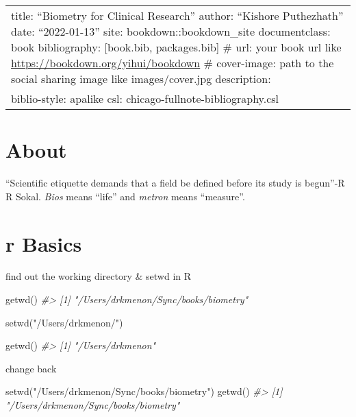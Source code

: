 \documentclass[
]{article}
\author{}
\date{\vspace{-2.5em}}
\newenvironment{Shaded}{\begin{snugshade}}{\end{snugshade}}
\newcommand{\CommentTok}[1]{\textcolor[rgb]{0.56,0.35,0.01}{\textit{#1}}}
\newcommand{\FunctionTok}[1]{\textcolor[rgb]{0.00,0.00,0.00}{#1}}
\newcommand{\NormalTok}[1]{#1}
\newcommand{\StringTok}[1]{\textcolor[rgb]{0.31,0.60,0.02}{#1}}
\begin{document}
{
\setcounter{tocdepth}{2}
\tableofcontents
}
\begin{longtable}[]{@{}
  >{\raggedright\arraybackslash}p{}@{}}
\toprule
\endhead
title: ``Biometry for Clinical Research''
author: ``Kishore Puthezhath''
date: ``2022-01-13''
site: bookdown::bookdown\_site
documentclass: book
bibliography: {[}book.bib, packages.bib{]}
\# url: your book url like \url{https://bookdown.org/yihui/bookdown}
\# cover-image: path to the social sharing image like images/cover.jpg
description: \textbar{} \\
biblio-style: apalike
csl: chicago-fullnote-bibliography.csl \\
\bottomrule
\end{longtable}

\hypertarget{about}{%
\section{About}\label{about}}

``Scientific etiquette demands that a field be defined before its study is begun''-R R Sokal. \emph{Bios} means ``life'' and \emph{metron} means ``measure''.

\hypertarget{r-basics}{%
\section{r Basics}\label{r-basics}}

find out the working directory \& setwd in R

\begin{Shaded}
\begin{Highlighting}[]
  
\FunctionTok{getwd}\NormalTok{()}
\CommentTok{\#\textgreater{} [1] "/Users/drkmenon/Sync/books/biometry"}
  

\FunctionTok{setwd}\NormalTok{(}\StringTok{"/Users/drkmenon/"}\NormalTok{)}

\FunctionTok{getwd}\NormalTok{()}
\CommentTok{\#\textgreater{} [1] "/Users/drkmenon"}
\end{Highlighting}
\end{Shaded}

change back

\begin{Shaded}
\begin{Highlighting}[]
\FunctionTok{setwd}\NormalTok{(}\StringTok{"/Users/drkmenon/Sync/books/biometry"}\NormalTok{)}
\FunctionTok{getwd}\NormalTok{()}
\CommentTok{\#\textgreater{} [1] "/Users/drkmenon/Sync/books/biometry"}
\end{Highlighting}
\end{Shaded}
\end{document}
